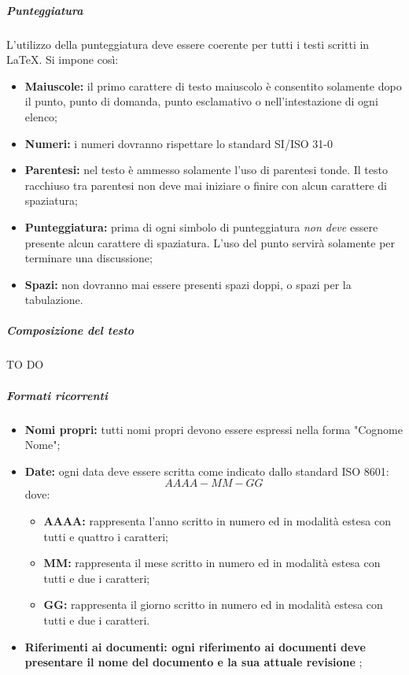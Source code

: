 				\subparagraph{Punteggiatura}
				L'utilizzo della punteggiatura deve essere coerente per tutti i testi scritti in \LaTeX. Si impone così:
				\begin{itemize}
				\item \textbf{Maiuscole:} il primo carattere di testo maiuscolo è consentito solamente dopo il punto, punto di domanda, punto esclamativo o nell'intestazione di ogni elenco;
				\item \textbf{Numeri:} i numeri dovranno rispettare lo standard SI/ISO 31-0 
				\item \textbf{Parentesi:} nel testo è ammesso solamente l'uso di parentesi tonde. Il testo racchiuso tra parentesi non deve mai iniziare o finire con alcun carattere di spaziatura;
				\item \textbf{Punteggiatura:} prima di ogni simbolo di punteggiatura \emph{non deve} essere presente alcun carattere di spaziatura. L'uso del punto servirà solamente per terminare una discussione;
				\item \textbf{Spazi:} non dovranno mai essere presenti spazi doppi, o spazi per la tabulazione.
				\end{itemize}				
				
				\subparagraph{Composizione del testo} TO DO
				
				\subparagraph{Formati ricorrenti}
				\begin{itemize}
				\item \textbf{Nomi propri:} tutti nomi propri devono essere espressi nella forma "Cognome Nome";
				\item \textbf{Date:} ogni data deve essere scritta come indicato dallo standard ISO 8601:\\
					\begin{displaymath}
					AAAA-MM-GG
					\end{displaymath}
					dove:
					\begin{itemize}
					\item \textbf{AAAA:} rappresenta l'anno scritto in numero ed in modalità estesa con tutti e quattro i caratteri;
					\item \textbf{MM:} rappresenta il mese scritto in numero ed in modalità estesa con tutti e due i caratteri;
					\item \textbf{GG:} rappresenta il giorno scritto in numero ed in modalità estesa con tutti e due i caratteri.
					\end{itemize}
				\item \textbf{Riferimenti ai documenti: ogni riferimento ai documenti deve presentare il nome del documento e la sua attuale revisione} ;
				\end{itemize}

